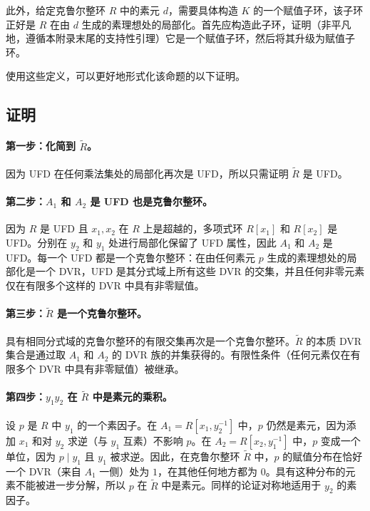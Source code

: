 ﻿\documentclass[]{pkuai4m}
\theoremstyle{plain}
\theoremstyle{definition}
\begin{document}
此外，给定克鲁尔整环 $R$ 中的素元 $d$，需要具体构造 $K$ 的一个赋值子环，该子环正好是 $R$ 在由 $d$ 生成的素理想处的局部化。首先应构造此子环，证明（非平凡地，遵循本附录末尾的支持性引理）它是一个赋值子环，然后将其升级为赋值子环。

使用这些定义，可以更好地形式化该命题的以下证明。

\subsection*{证明}

\paragraph{第一步：化简到 $\tilde{R}$。} 因为 UFD 在任何乘法集处的局部化再次是 UFD，所以只需证明 $\tilde{R}$ 是 UFD。

\paragraph{第二步：$A_1$ 和 $A_2$ 是 UFD 也是克鲁尔整环。} 因为 $R$ 是 UFD 且 $x_1, x_2$ 在 $R$ 上是超越的，多项式环 $R[x_1]$ 和 $R[x_2]$ 是 UFD。分别在 $y_2$ 和 $y_1$ 处进行局部化保留了 UFD 属性，因此 $A_1$ 和 $A_2$ 是 UFD。每一个 UFD 都是一个克鲁尔整环：在由任何素元 $p$ 生成的素理想处的局部化是一个 DVR，UFD 是其分式域上所有这些 DVR 的交集，并且任何非零元素仅在有限多个这样的 DVR 中具有非零赋值。

\paragraph{第三步：$\tilde{R}$ 是一个克鲁尔整环。} 具有相同分式域的克鲁尔整环的有限交集再次是一个克鲁尔整环。$\tilde{R}$ 的本质 DVR 集合是通过取 $A_1$ 和 $A_2$ 的 DVR 族的并集获得的。有限性条件（任何元素仅在有限多个 DVR 中具有非零赋值）被继承。

\paragraph{第四步：$y_1 y_2$ 在 $\tilde{R}$ 中是素元的乘积。} 设 $p$ 是 $R$ 中 $y_1$ 的一个素因子。在 $A_1 = R[x_1, y_2^{-1}]$ 中，$p$ 仍然是素元，因为添加 $x_1$ 和对 $y_2$ 求逆（与 $y_1$ 互素）不影响 $p$。在 $A_2 = R[x_2, y_1^{-1}]$ 中，$p$ 变成一个单位，因为 $p \mid y_1$ 且 $y_1$ 被求逆。因此，在克鲁尔整环 $\tilde{R}$ 中，$p$ 的赋值分布在恰好一个 DVR（来自 $A_1$ 一侧）处为 $1$，在其他任何地方都为 $0$。具有这种分布的元素不能被进一步分解，所以 $p$ 在 $\tilde{R}$ 中是素元。同样的论证对称地适用于 $y_2$ 的素因子。
\end{document}
